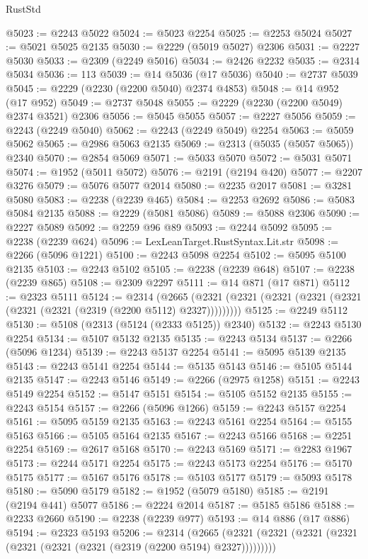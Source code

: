 \begin{lexlean}{RustStd}
\begin{coremodule}
@5023 := @2243 @5022
@5024 := @5023 @2254
@5025 := @2253 @5024
@5027 := @5021 @5025 @2135
@5030 := @2229 (@5019 @5027) @2306
@5031 := @2227 @5030
@5033 := @2309 (@2249 @5016)
@5034 := @2426 @2232
@5035 := @2314 @5034
@5036 := 113
@5039 := @14 @5036 (@17 @5036)
@5040 := @2737 @5039
@5045 := @2229 (@2230 (@2200 @5040) @2374 @4853)
@5048 := @14 @952 (@17 @952)
@5049 := @2737 @5048
@5055 := @2229 (@2230 (@2200 @5049) @2374 @3521) @2306
@5056 := @5045 @5055
@5057 := @2227 @5056
@5059 := @2243 (@2249 @5040)
@5062 := @2243 (@2249 @5049) @2254
@5063 := @5059 @5062
@5065 := @2986 @5063 @2135
@5069 := @2313 (@5035 (@5057 @5065)) @2340
@5070 := @2854 @5069
@5071 := @5033 @5070
@5072 := @5031 @5071
@5074 := @1952 (@5011 @5072)
@5076 := @2191 (@2194 @420)
@5077 := @2207 @3276
@5079 := @5076 @5077 @2014
@5080 := @2235 @2017
@5081 := @3281 @5080
@5083 := @2238 (@2239 @465)
@5084 := @2253 @2692
@5086 := @5083 @5084 @2135
@5088 := @2229 (@5081 @5086)
@5089 := @5088 @2306
@5090 := @2227 @5089
@5092 := @2259 @96 @89
@5093 := @2244 @5092
@5095 := @2238 (@2239 @624)
@5096 := LexLeanTarget.RustSyntax.Lit.str
@5098 := @2266 (@5096 @1221)
@5100 := @2243 @5098 @2254
@5102 := @5095 @5100 @2135
@5103 := @2243 @5102
@5105 := @2238 (@2239 @648)
@5107 := @2238 (@2239 @865)
@5108 := @2309 @2297
@5111 := @14 @871 (@17 @871)
@5112 := @2323 @5111
@5124 := @2314
    (@2665 (@2321 (@2321 (@2321 (@2321 (@2321 (@2321 (@2321 (@2319 (@2200 @5112) @2327)))))))))
@5125 := @2249 @5112
@5130 := @5108 (@2313 (@5124 (@2333 @5125)) @2340)
@5132 := @2243 @5130 @2254
@5134 := @5107 @5132 @2135
@5135 := @2243 @5134
@5137 := @2266 (@5096 @1234)
@5139 := @2243 @5137 @2254
@5141 := @5095 @5139 @2135
@5143 := @2243 @5141 @2254
@5144 := @5135 @5143
@5146 := @5105 @5144 @2135
@5147 := @2243 @5146
@5149 := @2266 (@2975 @1258)
@5151 := @2243 @5149 @2254
@5152 := @5147 @5151
@5154 := @5105 @5152 @2135
@5155 := @2243 @5154
@5157 := @2266 (@5096 @1266)
@5159 := @2243 @5157 @2254
@5161 := @5095 @5159 @2135
@5163 := @2243 @5161 @2254
@5164 := @5155 @5163
@5166 := @5105 @5164 @2135
@5167 := @2243 @5166
@5168 := @2251 @2254
@5169 := @2617 @5168
@5170 := @2243 @5169
@5171 := @2283 @1967
@5173 := @2244 @5171 @2254
@5175 := @2243 @5173 @2254
@5176 := @5170 @5175
@5177 := @5167 @5176
@5178 := @5103 @5177
@5179 := @5093 @5178
@5180 := @5090 @5179
@5182 := @1952 (@5079 @5180)
@5185 := @2191 (@2194 @441) @5077
@5186 := @2224 @2014
@5187 := @5185 @5186
@5188 := @2233 @2660
@5190 := @2238 (@2239 @977)
@5193 := @14 @886 (@17 @886)
@5194 := @2323 @5193
@5206 := @2314
    (@2665 (@2321 (@2321 (@2321 (@2321 (@2321 (@2321 (@2321 (@2319 (@2200 @5194) @2327)))))))))

\end{coremodule}
\end{lexlean}
